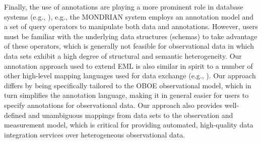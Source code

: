 Finally, the use of annotations are playing a more prominent role in
database systems (e.g.,
\cite{GeertsKM06,Reeve05SemanticAnnotation,BhagwatCTV04}), e.g., the
MONDRIAN system \cite{GeertsKM06} employs an annotation model and a
set of query operators to manipulate both data and annotations.
However, users must be familiar with the underlying data structures
(schemas) to take advantage of these operators, which is generally not
feasible for observational data in which data sets exhibit a high
degree of structural and semantic heterogeneity. Our annotation
approach used to extend EML is also similar in spirit to a number of
other high-level mapping languages used for data exchange (e.g.,
\cite{fagin09:_clio,an06:_build_seman_mappin_datab_ontol}). Our
approach differs by being specifically tailored to the OBOE
observational model, which in turn simplifies the annotation language,
making it in general easier for users to specify annotations for
observational data. Our approach also provides well-defined and
unambiguous mappings from data sets to the observation and measurement
model, which is critical for providing automated, high-quality data
integration services over heterogeneous observational data.





